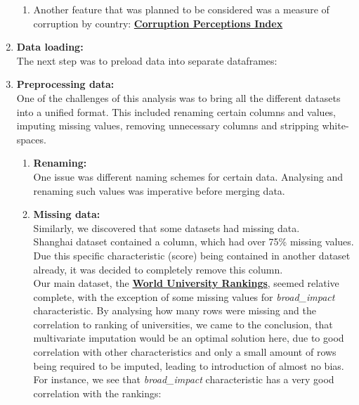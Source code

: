 \documentclass{article}
\begin{document}
\begin{enumerate}[label=\textbf {\arabic*.}]
\begin{enumerate}[label=\textbf {\alph*)}]
\item Another feature that was planned to be considered was a measure of corruption by country:
\href{https://www.kaggle.com/transparencyint/corruption-index\#history.csv}{\textbf{Corruption Perceptions Index}}

\end{enumerate}
\item \textbf{Data loading:} \\
The next step was to preload data into separate dataframes:

\item \textbf{Preprocessing data:} \\
One of the challenges of this analysis was to bring all the different datasets into a unified format. This included renaming certain columns and values, imputing missing values, removing unnecessary columns and stripping white-spaces.

\begin{enumerate}[label=\textbf {\alph*)}]
	
\item \textbf{Renaming:}\\One issue was different naming schemes for certain data. Analysing and renaming such values was imperative before merging data.

\item \textbf{Missing data:}
\\Similarly, we discovered that some datasets had missing data.
\\Shanghai dataset contained a column, which had over 75\% missing values. Due this specific characteristic (score) being contained in another dataset already, it was decided to completely remove this column.
\\Our main dataset, the \hyperlink{name}{\textbf{World University Rankings}}, seemed relative complete, with the exception of some missing values for  \emph{broad\_impact} characteristic. By analysing how many rows were missing and the correlation to ranking of universities, we came to the conclusion, that multivariate imputation would be an optimal solution here, due to good correlation with other characteristics and only a small amount of rows being required to be imputed, leading to introduction of almost no bias.
For instance, we see that \emph{broad\_impact} characteristic has a very good correlation with the rankings:


\end{enumerate}
\end{enumerate}
\end{document}
